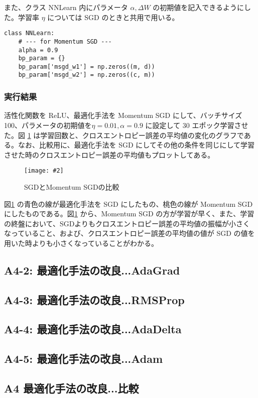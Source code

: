\documentclass[a4paper,dvipdfmx]{jsarticle}
\newcommand{\image}[3]{
    \begin{figure}[H]
        \begin{center}
        \texttt{[image: \#2]}
        \end{center}
        \caption{#1}
        \label{#3}
    \end{figure}
}
\begin{document}
また、クラス NNLearn 内にパラメータ $\alpha, \Delta W$ の初期値を記入できるようにした。学習率 $\eta$ については SGD のときと共用で用いる。
\begin{lstlisting}[caption="Momentum SGD",label=A4-1-1]
class NNLearn:
    # --- for Momentum SGD ---
    alpha = 0.9
    bp_param = {}
    bp_param['msgd_w1'] = np.zeros((m, d))
    bp_param['msgd_w2'] = np.zeros((c, m))
\end{lstlisting}
\subsubsection*{実行結果}

活性化関数を ReLU、最適化手法を Momentum SGD にして、バッチサイズ 100、パラメータの初期値を$\eta = 0.01, \alpha = 0.9$ に設定して 30 エポック学習させた。図 \ref{fig-A4-1-1} は学習回数と、クロスエントロピー誤差の平均値の変化のグラフである。なお、比較用に、最適化手法を SGD にしてその他の条件を同じにして学習させた時のクロスエントロピー誤差の平均値もプロットしてある。

\image{SGDとMomentum SGDの比較}{report_a4-1.png}{fig-A4-1-1}

図\ref{fig-A4-1-1} の青色の線が最適化手法を SGD にしたもの、桃色の線が Momentum SGD にしたものである。図\ref{fig-A4-1-1} から、Momentum SGD の方が学習が早く、また、学習の終盤において、SGDよりもクロスエントロピー誤差の平均値の振幅が小さくなっていること、および、クロスエントロピー誤差の平均値の値が SGD の値を用いた時よりも小さくなっていることがわかる。

\subsection*{A4-2: 最適化手法の改良...AdaGrad}

\subsection*{A4-3: 最適化手法の改良...RMSProp}

\subsection*{A4-4: 最適化手法の改良...AdaDelta}

\subsection*{A4-5: 最適化手法の改良...Adam}

\subsection*{A4 最適化手法の改良...比較}
\end{document}

